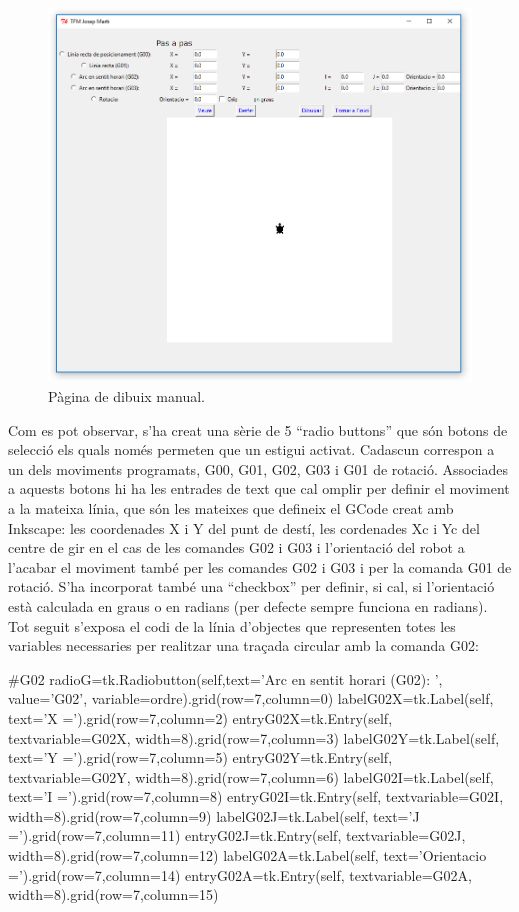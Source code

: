 \begin{figure}[H]
	\centering
	\includegraphics[scale=0.9]{ManualPage}
	\caption{Pàgina de dibuix manual.}
	\label{fig:ManualPage}
\end{figure}

Com es pot observar, s’ha creat una sèrie de 5  “radio buttons” que són botons de selecció els quals només permeten que un estigui activat. Cadascun correspon a un dels moviments programats, G00, G01, G02, G03 i G01 de rotació. Associades a aquests botons hi ha les entrades de text que cal omplir per definir el moviment a la mateixa línia, que són les mateixes que defineix el GCode creat amb Inkscape: les coordenades X i Y del punt de destí, les cordenades Xc i Yc del centre de gir en el cas de les comandes G02 i G03 i l’orientació del robot a l'acabar el moviment també per les comandes G02 i G03 i per la comanda G01 de rotació. S’ha incorporat també una “checkbox” per definir, si cal, si l’orientació està calculada en graus o en radians (per defecte sempre funciona en radians). Tot seguit s'exposa el codi de la línia d'objectes que representen totes les variables necessaries per realitzar una traçada circular amb la comanda G02:

\begin{python}
		#G02
		radioG=tk.Radiobutton(self,text='Arc en sentit horari (G02): ', value='G02', variable=ordre).grid(row=7,column=0)
		labelG02X=tk.Label(self, text='X =').grid(row=7,column=2)
		entryG02X=tk.Entry(self, textvariable=G02X, width=8).grid(row=7,column=3)
		labelG02Y=tk.Label(self, text='Y =').grid(row=7,column=5)
		entryG02Y=tk.Entry(self, textvariable=G02Y, width=8).grid(row=7,column=6)
		labelG02I=tk.Label(self, text='I =').grid(row=7,column=8)
		entryG02I=tk.Entry(self, textvariable=G02I, width=8).grid(row=7,column=9)
		labelG02J=tk.Label(self, text='J =').grid(row=7,column=11)
		entryG02J=tk.Entry(self, textvariable=G02J, width=8).grid(row=7,column=12)
		labelG02A=tk.Label(self, text='Orientacio =').grid(row=7,column=14)
		entryG02A=tk.Entry(self, textvariable=G02A, width=8).grid(row=7,column=15)
\end{python}


